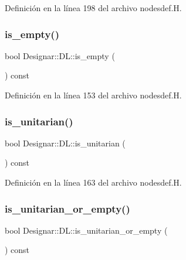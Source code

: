 Definición en la línea 198 del archivo nodesdef.\+H.

\mbox{\label{class_designar_1_1_d_l_a01d421aa787edb4087c1b2c266554ca5}} 
\subsubsection{\texorpdfstring{is\+\_\+empty()}{is\_empty()}}
{\footnotesize\ttfamily bool Designar\+::\+D\+L\+::is\+\_\+empty (\begin{DoxyParamCaption}{ }\end{DoxyParamCaption}) const\hspace{0.3cm}{\ttfamily [inline]}}



Definición en la línea 153 del archivo nodesdef.\+H.

\mbox{\label{class_designar_1_1_d_l_a262dfc0edc2656658f89b39ee272fac6}} 
\subsubsection{\texorpdfstring{is\+\_\+unitarian()}{is\_unitarian()}}
{\footnotesize\ttfamily bool Designar\+::\+D\+L\+::is\+\_\+unitarian (\begin{DoxyParamCaption}{ }\end{DoxyParamCaption}) const\hspace{0.3cm}{\ttfamily [inline]}}



Definición en la línea 163 del archivo nodesdef.\+H.

\mbox{\label{class_designar_1_1_d_l_aae41f00b718a0fe8bed1be458b2dffac}} 
\subsubsection{\texorpdfstring{is\+\_\+unitarian\+\_\+or\+\_\+empty()}{is\_unitarian\_or\_empty()}}
{\footnotesize\ttfamily bool Designar\+::\+D\+L\+::is\+\_\+unitarian\+\_\+or\+\_\+empty (\begin{DoxyParamCaption}{ }\end{DoxyParamCaption}) const\hspace{0.3cm}{\ttfamily [inline]}}



